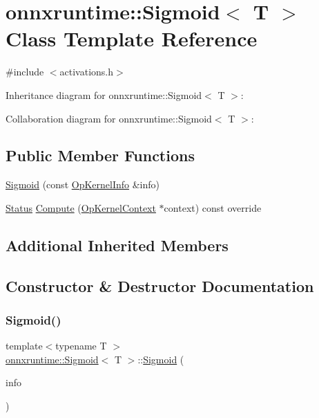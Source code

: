 \hypertarget{classonnxruntime_1_1Sigmoid}{}\section{onnxruntime\+:\+:Sigmoid$<$ T $>$ Class Template Reference}
\label{classonnxruntime_1_1Sigmoid}


{\ttfamily \#include $<$activations.\+h$>$}



Inheritance diagram for onnxruntime\+:\+:Sigmoid$<$ T $>$\+:


Collaboration diagram for onnxruntime\+:\+:Sigmoid$<$ T $>$\+:
\subsection*{Public Member Functions}
\begin{DoxyCompactItemize}
\item 
\mbox{\hyperlink{classonnxruntime_1_1Sigmoid_aedb6b3be4b4d01f84e152871152082e9}{Sigmoid}} (const \mbox{\hyperlink{classonnxruntime_1_1OpKernelInfo}{Op\+Kernel\+Info}} \&info)
\item 
\mbox{\hyperlink{classonnxruntime_1_1common_1_1Status}{Status}} \mbox{\hyperlink{classonnxruntime_1_1Sigmoid_a104d23d42bb1364ff564a52860cb9f9b}{Compute}} (\mbox{\hyperlink{classonnxruntime_1_1OpKernelContext}{Op\+Kernel\+Context}} $\ast$context) const override
\end{DoxyCompactItemize}
\subsection*{Additional Inherited Members}


\subsection{Constructor \& Destructor Documentation}
\mbox{\label{classonnxruntime_1_1Sigmoid_aedb6b3be4b4d01f84e152871152082e9}} 
\subsubsection{\texorpdfstring{Sigmoid()}{Sigmoid()}}
{\footnotesize\ttfamily template$<$typename T $>$ \\
\mbox{\hyperlink{classonnxruntime_1_1Sigmoid}{onnxruntime\+::\+Sigmoid}}$<$ T $>$\+::\mbox{\hyperlink{classonnxruntime_1_1Sigmoid}{Sigmoid}} (\begin{DoxyParamCaption}\item[{const \mbox{\hyperlink{classonnxruntime_1_1OpKernelInfo}{Op\+Kernel\+Info}} \&}]{info }\end{DoxyParamCaption})\hspace{0.3cm}{\ttfamily [inline]}}



